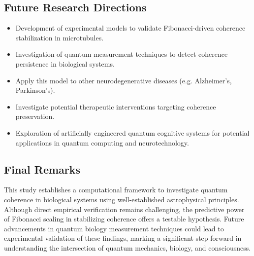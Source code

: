 \subsection{Future Research Directions}
\begin{itemize}
    \item Development of experimental models to validate Fibonacci-driven coherence stabilization in microtubules.
    \item Investigation of quantum measurement techniques to detect coherence persistence in biological systems.
    \item Apply this model to other neurodegenerative diseases (e.g. Alzheimer's, Parkinson's).
    \item Investigate potential therapeutic interventions targeting coherence preservation.
    \item Exploration of artificially engineered quantum cognitive systems for potential applications in quantum computing and neurotechnology.
\end{itemize}
\subsection{Final Remarks}  
This study establishes a computational framework to investigate quantum coherence in biological systems using well-established astrophysical principles. Although direct empirical verification remains challenging, the predictive power of Fibonacci scaling in stabilizing coherence offers a testable hypothesis. Future advancements in quantum biology measurement techniques could lead to experimental validation of these findings, marking a significant step forward in understanding the intersection of quantum mechanics, biology, and consciousness.



